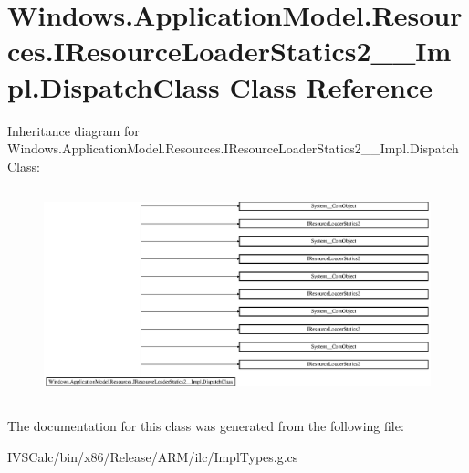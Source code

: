 \hypertarget{class_windows_1_1_application_model_1_1_resources_1_1_i_resource_loader_statics2_____impl_1_1_dispatch_class}{}\section{Windows.\+Application\+Model.\+Resources.\+I\+Resource\+Loader\+Statics2\+\_\+\+\_\+\+Impl.\+Dispatch\+Class Class Reference}
\label{class_windows_1_1_application_model_1_1_resources_1_1_i_resource_loader_statics2_____impl_1_1_dispatch_class}
Inheritance diagram for Windows.\+Application\+Model.\+Resources.\+I\+Resource\+Loader\+Statics2\+\_\+\+\_\+\+Impl.\+Dispatch\+Class\+:\begin{figure}[H]
\begin{center}
\leavevmode
\includegraphics[height=6.147705cm]{class_windows_1_1_application_model_1_1_resources_1_1_i_resource_loader_statics2_____impl_1_1_dispatch_class}
\end{center}
\end{figure}


The documentation for this class was generated from the following file\+:\begin{DoxyCompactItemize}
\item 
I\+V\+S\+Calc/bin/x86/\+Release/\+A\+R\+M/ilc/Impl\+Types.\+g.\+cs\end{DoxyCompactItemize}
